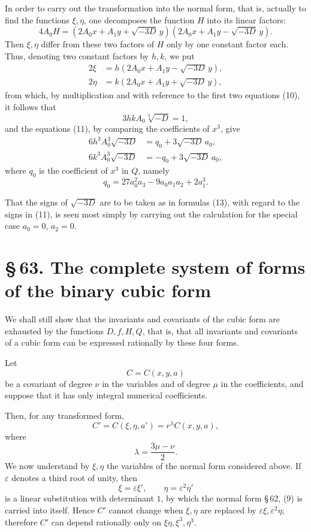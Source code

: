 \documentclass[11pt]{article}
\newcommand{\sect}[2]{\section*{\S\,#1. #2}}
\begin{document}
In order to carry out the transformation into the normal form, that is, actually to find the functions $\xi,\eta$, one decomposes the function $H$ into its linear factors:
\[
 4A_0H=(2A_0x+A_1y+\sqrt{-3D}\,y)(2A_0x+A_1y-\sqrt{-3D}\,y).
\]
Then $\xi,\eta$ differ from these two factors of $H$ only by one constant factor each. Thus, denoting two constant factors by $h,k$, we put
\begin{equation}
\begin{aligned}
 2\xi&=h(2A_0x+A_1y-\sqrt{-3D}\,y),\\
 2\eta&=k(2A_0x+A_1y+\sqrt{-3D}\,y),
\end{aligned}
\tag{13}
\end{equation}
from which, by multiplication and with reference to the first two equations (10), it follows that
\begin{equation}
 3hkA_0\sqrt[3]{-D}=1,
\tag{14}
\end{equation}
and the equations (11), by comparing the coefficients of $x^3$, give
\begin{equation}
\begin{aligned}
 6h^3A_0^3\sqrt{-3D}&=q_0+3\sqrt{-3D}\,a_0,\\
 6k^3A_0^3\sqrt{-3D}&=-q_0+3\sqrt{-3D}\,a_0,
\end{aligned}
\tag{15}
\end{equation}
where $q_0$ is the coefficient of $x^3$ in $Q$, namely
\begin{equation}
 q_0=27a_0^2a_3-9a_0a_1a_2+2a_1^3.
\tag{16}
\end{equation}

That the signs of $\sqrt{-3D}$ are to be taken as in formulas (13), with regard to the signs in (11), is seen most simply by carrying out the calculation for the special case $a_0=0$, $a_2=0$.

\sect{63}{The complete system of forms of the binary cubic form}

We shall still show that the invariants and covariants of the cubic form are exhausted by the functions $D,f,H,Q$, that is, that all invariants and covariants of a cubic form can be expressed rationally by these four forms.

Let
\[
 C=C(x,y,a)
\]
be a covariant of degree $\nu$ in the variables and of degree $\mu$ in the coefficients, and suppose that it has only integral numerical coefficients.

Then, for any transformed form,
\begin{equation}
 C'=C(\xi,\eta,a')=r^\lambda C(x,y,a),
\tag{1}
\end{equation}
where
\begin{equation}
 \lambda=\frac{3\mu-\nu}{2}.
\tag{2}
\end{equation}
We now understand by $\xi,\eta$ the variables of the normal form considered above. If $\varepsilon$ denotes a third root of unity, then
\[
 \xi=\varepsilon\xi',
 \qquad
 \eta=\varepsilon^2\eta'
\]
is a linear substitution with determinant $1$, by which the normal form \S\,62, (9) is carried into itself. Hence $C'$ cannot change when $\xi,\eta$ are replaced by $\varepsilon\xi,\varepsilon^2\eta$; therefore $C'$ can depend rationally only on $\xi\eta,\xi^3,\eta^3$.
\end{document}
